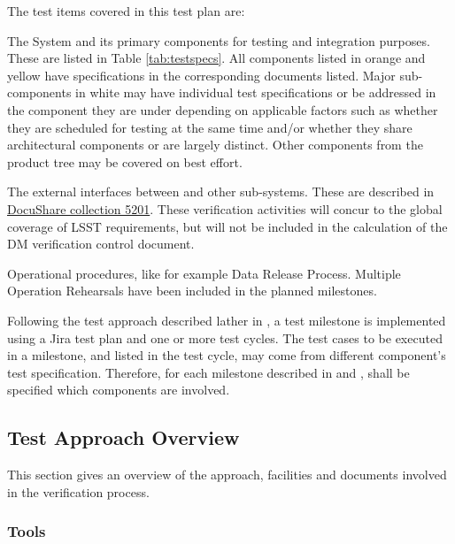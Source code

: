 The test items covered in this test plan are:

\begin{itemize_single}

\item The \product{} System and its primary components for testing and integration purposes. These are listed in Table \ref{tab:testspecs}.
All components listed in orange and yellow have specifications in the corresponding documents listed.
Major sub-components in white may have individual test specifications or be addressed in the component they are under depending on applicable factors such as whether they are scheduled for testing at the same time and/or whether they share architectural components or are largely distinct.
Other components from the product tree may be covered on best effort.

\item The external interfaces between \product{} and other sub-systems. These are described in \href{https://ls.st/Collection-5201}{DocuShare collection 5201}. These verification activities will concur to the global coverage of LSST requirements, but will not be included in the calculation of the DM verification control document.


\item Operational procedures, like for example Data Release Process. Multiple Operation Rehearsals have been included in the planned milestones.

\end{itemize_single}



Following the test approach described lather in , a test milestone is implemented using a Jira test plan and one or more test cycles.
The test cases to be executed in a milestone, and listed in the test cycle, may come from different component's test specification.
Therefore, for each milestone described in  and , shall be specified which components are involved.

\subsection{Test Approach Overview}\label{sect:tsform}

This section gives an overview of the approach, facilities and documents involved in the verification process.


\subsubsection{Tools}


